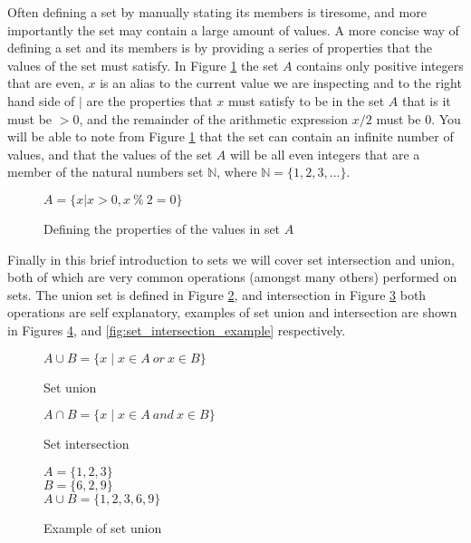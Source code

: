 Often defining a set by manually stating its members is tiresome, and more importantly the set may contain a large amount of values. A more concise way of defining a set and its members is by providing a series of properties that the values of the set must satisfy. In Figure \ref{fig:set_member_properties} the set $A$ contains only positive integers that are even, $x$ is an alias to the current value we are inspecting and to the right hand side of $\mid$ are the properties that $x$ must satisfy to be in the set $A$ that is it must be $> 0$, and the remainder of the arithmetic expression $x / 2$ must be $0$.
You will be able to note from Figure \ref{fig:set_member_properties} that the set can contain an infinite number of values, and that the values of the set $A$ will be all even integers that are a member of the natural numbers set $\mathbb{N}$, where $\mathbb{N} = \{1, 2, 3, ...\}$.

\begin{figure}
\begin{center}
$A = \{x|x > 0, x~\%~2 = 0\}$
\end{center}
\caption{Defining the properties of the values in set $A$} \label{fig:set_member_properties}
\end{figure}

Finally in this brief introduction to sets we will cover set intersection and union, both of which are very common operations (amongst many others) performed on sets. The union set is defined in Figure \ref{fig:set_union}, and intersection in Figure \ref{set_intersection} both operations are self explanatory, examples of set union and intersection are shown in Figures \ref{fig:set_union_example}, and \ref{fig:set_intersection_example} respectively.

\begin{figure}
\begin{center}
$A \cup B = \{x \mid x \in A~or~x \in B\}$
\end{center}
\caption{Set union} \label{fig:set_union}
\end{figure}

\begin{figure}
\begin{center}
$A \cap B = \{x \mid x \in A~and~x \in B\}$
\end{center}
\caption{Set intersection} \label{set_intersection}
\end{figure}

\begin{figure}
\begin{center}
$A = \{1, 2, 3\}$ \\
$B = \{6, 2, 9\}$ \\
$A \cup B= \{1, 2, 3, 6, 9\}$
\end{center}
\caption{Example of set union} \label{fig:set_union_example}
\end{figure}

